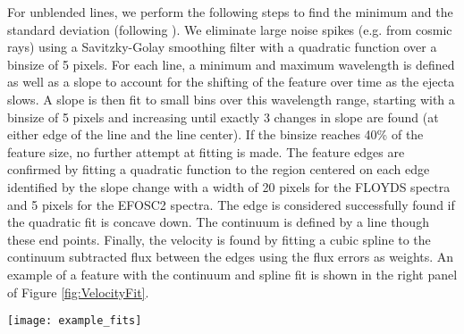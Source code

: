 \documentclass[a4paper,fleqn,usenatbib]{mnras}
\begin{document}
For unblended lines, we perform the following steps to find the minimum and the standard deviation (following \citealt{2012silverman}).
We eliminate large noise spikes (e.g. from cosmic rays) using a Savitzky-Golay smoothing filter \citep{1964savitzky} with a quadratic function over a binsize of 5 pixels. 
For each line, a minimum and maximum wavelength is defined as well as a slope to account for the shifting of the feature over time as the ejecta slows. 
A slope is then fit to small bins over this wavelength range, starting with a binsize of 5 pixels and increasing until exactly 3 changes in slope are found (at either edge of the line and the line center). 
If the binsize reaches 40\% of the feature size, no further attempt at fitting is made. 
The feature edges are confirmed by fitting a quadratic function to the region centered on each edge identified by the slope change with a width of 20 pixels for the FLOYDS spectra and 5 pixels for the EFOSC2 spectra. 
The edge is considered successfully found if the quadratic fit is concave down. 
The continuum is defined by a line though these end points.
Finally, the velocity is found by fitting a cubic spline to the continuum subtracted flux between the edges using the flux errors as weights. 
An example of a feature with the continuum and spline fit is shown in the right panel of Figure \ref{fig:VelocityFit}.
\begin{figure*}
\begin{center}
\texttt{[image: example\_fits]}
\caption{An example of a fit to the multi-component Ca II NIR triplet (left) using multiple Gaussians and a single line fit (following \citealt{2012silverman}, right) to the Sc II $\rm{\lambda}$5662 line.
The observed spectrum is plotted in black.
The continuum edges are marked with a cyan circle and the cyan dashed line connecting these points is used as the continuum. 
The Ca II NIR triplet fit is found by simultaneously fitting 3 Gaussians with the same standard deviation and mean offsets corresponding to the expected wavelength separation of the triplet. 
The individual Gaussians are plotting at as dotted lines and the combined fit is plotted as a solid green line. 
The minima of the individual Gaussians is used to find the velocity of each component.
The Sc II feature is fit with a cubic spliine. 
The minimum of the spline is used to find the Sc II velocity.
\label{fig:VelocityFit}}
\end{center}
\end{figure*}
\bsp	%
\label{lastpage}
\end{document}
